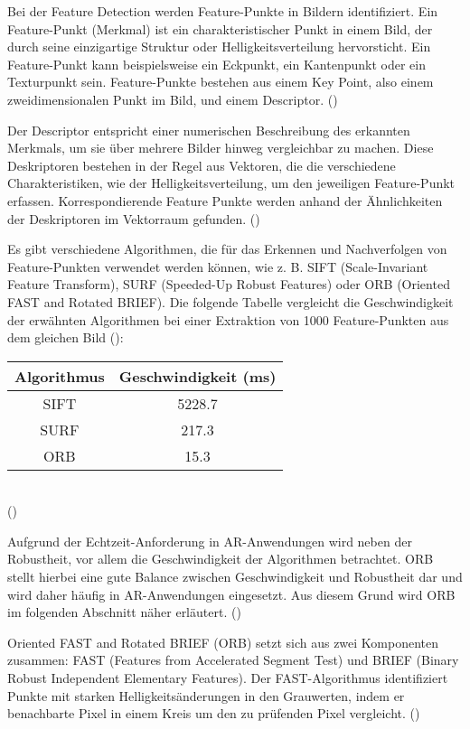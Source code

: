 Bei der Feature Detection werden Feature-Punkte in Bildern identifiziert. Ein Feature-Punkt (Merkmal) ist ein charakteristischer Punkt in einem Bild, der durch seine einzigartige Struktur oder Helligkeitsverteilung hervorsticht. Ein Feature-Punkt kann beispielsweise ein Eckpunkt, ein Kantenpunkt oder ein Texturpunkt sein. Feature-Punkte bestehen aus einem Key Point, also einem zweidimensionalen Punkt im Bild, und einem Descriptor. (\cite{gao2021vSLAM, szeliski2022computerVision})

Der Descriptor entspricht einer numerischen Beschreibung des erkannten Merkmals, um sie über mehrere Bilder hinweg vergleichbar zu machen. Diese Deskriptoren bestehen in der Regel aus Vektoren, die die verschiedene Charakteristiken, wie der Helligkeitsverteilung, um den jeweiligen Feature-Punkt erfassen. Korrespondierende Feature Punkte werden anhand der Ähnlichkeiten der Deskriptoren im Vektorraum gefunden. (\cite{gao2021vSLAM, szeliski2022computerVision})

Es gibt verschiedene Algorithmen, die für das Erkennen und Nachverfolgen von Feature-Punkten verwendet werden können, wie z. B. SIFT (Scale-Invariant Feature Transform), SURF (Speeded-Up Robust Features) oder ORB (Oriented FAST and Rotated BRIEF). Die folgende Tabelle vergleicht die Geschwindigkeit der erwähnten Algorithmen bei einer Extraktion von 1000 Feature-Punkten aus dem gleichen Bild (\cite{gao2021vSLAM}):

\begin{center}
    \begin{tabular}{ |c|c| } 
        \hline
        Algorithmus & Geschwindigkeit (ms) \\
        \hline
        SIFT & 5228.7 \\
        SURF & 217.3 \\
        ORB & 15.3 \\
        \hline
    \end{tabular} \\
    (\cite{gao2021vSLAM})
\end{center}

Aufgrund der Echtzeit-Anforderung in AR-Anwendungen wird neben der Robustheit, vor allem die Geschwindigkeit der Algorithmen betrachtet. ORB stellt hierbei eine gute Balance zwischen Geschwindigkeit und Robustheit dar und wird daher häufig in AR-Anwendungen eingesetzt. Aus diesem Grund wird ORB im folgenden Abschnitt näher erläutert. (\cite{gao2021vSLAM, rublee2011orb})

Oriented FAST and Rotated BRIEF (ORB) setzt sich aus zwei Komponenten zusammen: FAST (Features from Accelerated Segment Test) und BRIEF (Binary Robust Independent Elementary Features). Der FAST-Algorithmus identifiziert Punkte mit starken Helligkeitsänderungen in den Grauwerten, indem er benachbarte Pixel in einem Kreis um den zu prüfenden Pixel vergleicht. (\cite{gao2021vSLAM, rublee2011orb})

